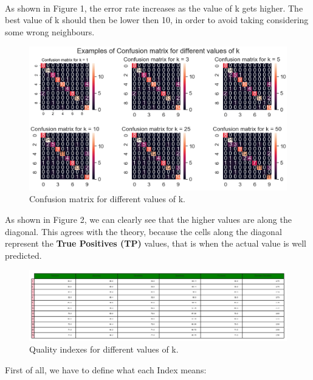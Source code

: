 \documentclass[10pt]{article}
\begin{document}
\\
As shown in Figure 1, the error rate increases as the value of k gets higher. The best value of k should then be lower then 10, in order to avoid taking considering some wrong neighbours.

\begin{figure}[h] 
	\centering
	\includegraphics[width=0.9\columnwidth]{Figure_2.png} %
	\caption{Confusion matrix for different values of k.}
\end{figure}
\newpage
As shown in Figure 2, we can clearly see that the higher values are along the diagonal. This agrees with the theory, because the cells along the diagonal represent the \textbf{True Positives (TP)} values, that is when the actual value is well predicted.

\begin{figure}[h] 
	\centering
	\includegraphics[width=1.0\columnwidth]{Figure_3.png} %
	\caption{Quality indexes for different values of k.}
\end{figure}

First of all, we have to define what each Index means:
\end{document}
